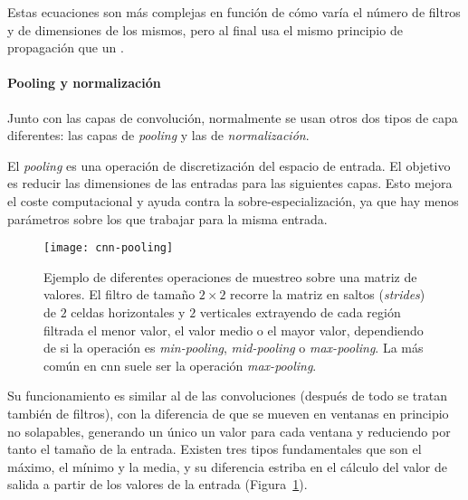Estas ecuaciones son más complejas en función de cómo varía el número de filtros y de dimensiones de los mismos, pero al final usa el mismo principio de propagación que un .

\paragraph{Pooling y normalización}

Junto con las capas de convolución, normalmente se usan otros dos tipos de capa diferentes: las capas de \textit{pooling} y las de \textit{normalización}.

El \textit{pooling} es una operación de discretización del espacio de entrada. El objetivo es reducir las dimensiones de las entradas para las siguientes capas. Esto mejora el coste computacional y ayuda contra la sobre-especialización, ya que hay menos parámetros sobre los que trabajar para la misma entrada.

\begin{figure}[t]
	\centering
	\texttt{[image: cnn-pooling]}
	\caption[Diferentes operaciones de muestreo]{Ejemplo de diferentes operaciones de muestreo sobre una matriz de valores. El filtro de tamaño $2 \times 2$ recorre la matriz en saltos (\textit{strides}) de $2$ celdas horizontales y $2$ verticales extrayendo de cada región filtrada el menor valor, el valor medio o el mayor valor, dependiendo de si la operación es \textit{min-pooling}, \textit{mid-pooling} o \textit{max-pooling}. La más común en \acrshort{cnn} suele ser la operación \textit{max-pooling}.}
	\label{fig:cnn-max-pooling}
\end{figure}

Su funcionamiento es similar al de las convoluciones (después de todo se tratan también de filtros), con la diferencia de que se mueven en ventanas en principio no solapables, generando un único un valor para cada ventana y reduciendo por tanto el tamaño de la entrada. Existen tres tipos fundamentales que son el máximo, el mínimo y la media, y su diferencia estriba en el cálculo del valor de salida a partir de los valores de la entrada (Figura~\ref{fig:cnn-max-pooling}).

